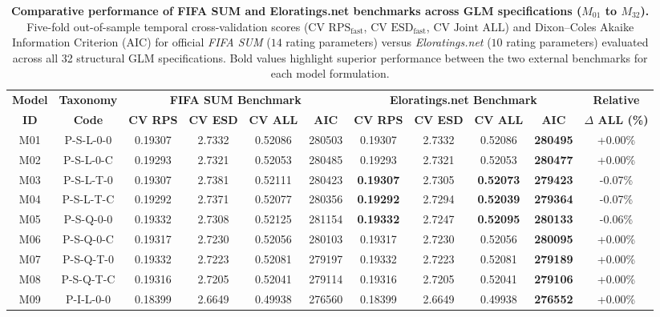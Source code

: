 \begin{table}[t]
\centering
\caption{\textbf{Comparative performance of FIFA SUM and Eloratings.net benchmarks across GLM specifications ($M_{01}$ to $M_{32}$).} 
Five-fold out-of-sample temporal cross-validation scores ($\text{CV RPS}_{\text{fast}}$, $\text{CV ESD}_{\text{fast}}$, $\text{CV Joint ALL}$) and Dixon--Coles Akaike Information Criterion ($\text{AIC}$) for official \textit{FIFA SUM} ($14$ rating parameters) versus \textit{Eloratings.net} ($10$ rating parameters) evaluated across all 32 structural GLM specifications. Bold values highlight superior performance between the two external benchmarks for each model formulation.}
\label{tab:fifa_vs_eloratings_m01_m32}
\small
\setlength{\tabcolsep}{4.5pt}
\begin{tabular}{cc | cccc | cccc | c}
\hline\hline
\textbf{Model} & \textbf{Taxonomy} & \multicolumn{4}{c|}{\textbf{FIFA SUM Benchmark}} & \multicolumn{4}{c|}{\textbf{Eloratings.net Benchmark}} & \textbf{Relative} \\
\textbf{ID} & \textbf{Code} & \textbf{CV RPS} & \textbf{CV ESD} & \textbf{CV ALL} & \textbf{AIC} & \textbf{CV RPS} & \textbf{CV ESD} & \textbf{CV ALL} & \textbf{AIC} & \textbf{$\Delta$ ALL (\%)} \\
\hline
M01 & P-S-L-0-0 & 0.19307 & 2.7332 & 0.52086 & 280503 & 0.19307 & 2.7332 & 0.52086 & \textbf{280495} & +0.00\% \\
M02 & P-S-L-0-C & 0.19293 & 2.7321 & 0.52053 & 280485 & 0.19293 & 2.7321 & 0.52053 & \textbf{280477} & +0.00\% \\
M03 & P-S-L-T-0 & 0.19307 & 2.7381 & 0.52111 & 280423 & \textbf{0.19307} & 2.7305 & \textbf{0.52073} & \textbf{279423} & -0.07\% \\
M04 & P-S-L-T-C & 0.19292 & 2.7371 & 0.52077 & 280356 & \textbf{0.19292} & 2.7294 & \textbf{0.52039} & \textbf{279364} & -0.07\% \\
M05 & P-S-Q-0-0 & 0.19332 & 2.7308 & 0.52125 & 281154 & \textbf{0.19332} & 2.7247 & \textbf{0.52095} & \textbf{280133} & -0.06\% \\
M06 & P-S-Q-0-C & 0.19317 & 2.7230 & 0.52056 & 280103 & 0.19317 & 2.7230 & 0.52056 & \textbf{280095} & +0.00\% \\
M07 & P-S-Q-T-0 & 0.19332 & 2.7223 & 0.52081 & 279197 & 0.19332 & 2.7223 & 0.52081 & \textbf{279189} & +0.00\% \\
M08 & P-S-Q-T-C & 0.19316 & 2.7205 & 0.52041 & 279114 & 0.19316 & 2.7205 & 0.52041 & \textbf{279106} & +0.00\% \\
M09 & P-I-L-0-0 & 0.18399 & 2.6649 & 0.49938 & 276560 & 0.18399 & 2.6649 & 0.49938 & \textbf{276552} & +0.00\% \\

\end{tabular}
\end{table}
